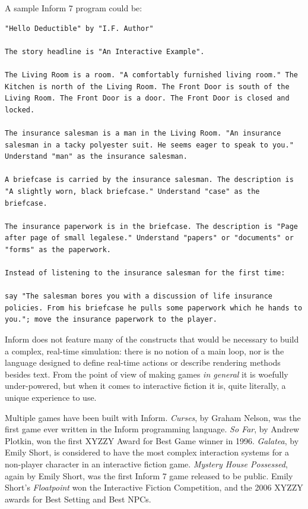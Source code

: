 A sample Inform 7 program could be:

\begin{lstlisting}
"Hello Deductible" by "I.F. Author"

The story headline is "An Interactive Example".

The Living Room is a room. "A comfortably furnished living room." The Kitchen is north of the Living Room. The Front Door is south of the Living Room. The Front Door is a door. The Front Door is closed and locked.

The insurance salesman is a man in the Living Room. "An insurance salesman in a tacky polyester suit. He seems eager to speak to you." Understand "man" as the insurance salesman.

A briefcase is carried by the insurance salesman. The description is "A slightly worn, black briefcase." Understand "case" as the briefcase.

The insurance paperwork is in the briefcase. The description is "Page after page of small legalese." Understand "papers" or "documents" or "forms" as the paperwork.

Instead of listening to the insurance salesman for the first time:

say "The salesman bores you with a discussion of life insurance policies. From his briefcase he pulls some paperwork which he hands to you."; move the insurance paperwork to the player.
\end{lstlisting}

Inform does not feature many of the constructs that would be necessary to build a complex, real-time simulation: there is no notion of a main loop, nor is the language designed to define real-time actions or describe rendering methods besides text. From the point of view of making games \textit{in general} it is woefully under-powered, but when it comes to interactive fiction it is, quite literally, a unique experience to use.

Multiple games have been built with Inform. \textit{Curses}, by Graham Nelson, was the first game ever written in the Inform programming language. \textit{So Far}, by Andrew Plotkin, won the first XYZZY Award for Best Game winner in 1996. \textit{Galatea}, by Emily Short, is considered to have the most complex interaction systems for a non-player character in an interactive fiction game. \textit{Mystery House Possessed}, again by Emily Short, was the first Inform 7 game released to be public. Emily Short's \textit{Floatpoint} won the Interactive Fiction Competition, and the 2006 XYZZY awards for Best Setting and Best NPCs.



